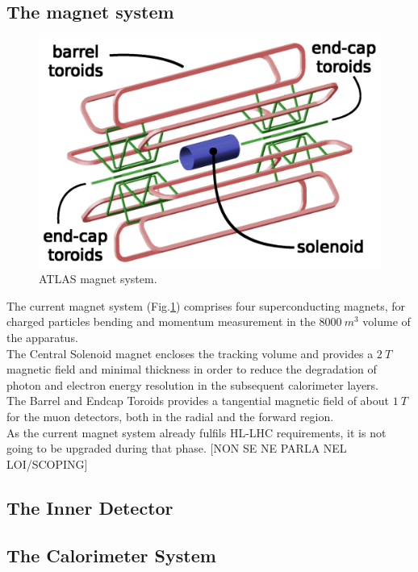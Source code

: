\documentclass[a4paper,12pt]{article}
\begin{document}
\subsection{The magnet system}\label{sec:magnet}

\begin{figure} [h]
	\includegraphics[width=\textwidth]{magnetSystems}
	\caption{ATLAS magnet system\cite{magnet_system_picture}.}
	\label{fig:magnet_system_picture}
\end{figure}

The current magnet system (Fig.\ref{fig:magnet_system_picture}) comprises four superconducting magnets\cite{magnetic_system}, for charged particles bending and momentum measurement in the $8000\ m^3$ volume of the apparatus.\\[2pt]
The Central Solenoid magnet encloses the tracking volume and provides a $2\ T$ magnetic field and minimal thickness in order to reduce the degradation of photon and electron energy resolution in the subsequent calorimeter layers.\\[2pt]
The Barrel and Endcap Toroids provides a tangential magnetic field of about $1\ T$ for the muon detectors, both in the radial and the forward region.\\[2pt]
As the current magnet system already fulfils HL-LHC requirements, it is not going to be
upgraded during that phase. [NON SE NE PARLA NEL LOI/SCOPING]

\subsection{The Inner Detector}

\subsection{The Calorimeter System}
\end{document}
